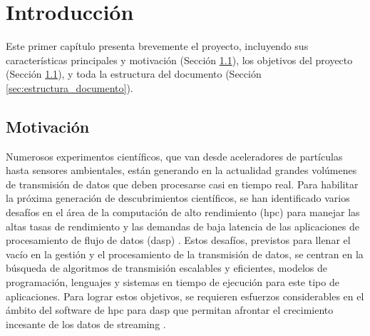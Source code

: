 \chead[]{}
\renewcommand{\headrulewidth}{0.5pt}

\lfoot[]{}
\cfoot[]{}
\rfoot[]{}
\renewcommand{\footrulewidth}{0pt}

\chapter{Introducción}
\label{ch:introduccion}

Este primer capítulo presenta brevemente el proyecto, incluyendo sus características principales y motivación (Sección \ref{sec:motivacion}), los objetivos del proyecto (Sección \ref{sec:motivacion}), y toda la estructura del documento (Sección \ref{sec:estructura_documento}).

\section{Motivación}
\label{sec:motivacion}

Numerosos experimentos científicos, que van desde aceleradores de partículas hasta sensores ambientales, están generando en la actualidad grandes volúmenes de transmisión de datos que deben procesarse casi en tiempo real. Para habilitar la próxima generación de descubrimientos científicos, se han identificado varios desafíos en el área de la computación de alto rendimiento (\acrshort{hpc}) para manejar las altas tasas de rendimiento y las demandas de baja latencia de las aplicaciones de procesamiento de flujo de datos (\acrshort{dasp}) \cite{stream2016}. Estos desafíos, previstos para llenar el vacío en la gestión y el procesamiento de la transmisión de datos, se centran en la búsqueda de algoritmos de transmisión escalables y eficientes, modelos de programación, lenguajes y sistemas en tiempo de ejecución para este tipo de aplicaciones. Para lograr estos objetivos, se requieren esfuerzos considerables en el ámbito del software de \acrshort{hpc} para \acrshort{dasp} que permitan afrontar el crecimiento incesante de los datos de streaming \cite{Kamburugamuve2016}.

